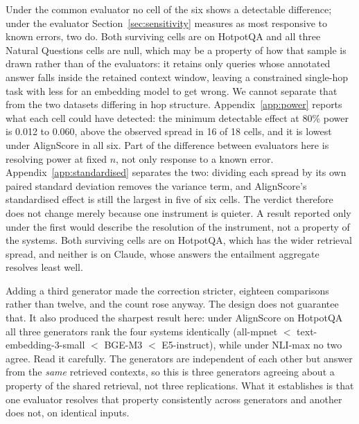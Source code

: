 \documentclass[11pt]{article}
\begin{document}
Under the common evaluator no cell of the six shows a detectable difference; under the evaluator Section~\ref{sec:sensitivity} measures as most responsive to known errors, two do. Both surviving cells are on HotpotQA and all three Natural Questions cells are null, which may be a property of how that sample is drawn rather than of the evaluators: it retains only queries whose annotated answer falls inside the retained context window, leaving a constrained single-hop task with less for an embedding model to get wrong. We cannot separate that from the two datasets differing in hop structure. Appendix~\ref{app:power} reports what each cell could have detected: the minimum detectable effect at 80\% power is 0.012 to 0.060, above the observed spread in 16 of 18 cells, and it is lowest under AlignScore in all six. Part of the difference between evaluators here is resolving power at fixed $n$, not only response to a known error. Appendix~\ref{app:standardised} separates the two: dividing each spread by its own paired standard deviation removes the variance term, and AlignScore's standardised effect is still the largest in five of six cells. The verdict therefore does not change merely because one instrument is quieter. A result reported only under the first would describe the resolution of the instrument, not a property of the systems. Both surviving cells are on HotpotQA, which has the wider retrieval spread, and neither is on Claude, whose answers the entailment aggregate resolves least well.

Adding a third generator made the correction stricter, eighteen comparisons rather than twelve, and the count rose anyway. The design does not guarantee that. It also produced the sharpest result here: under AlignScore on HotpotQA all three generators rank the four systems identically (all-mpnet $<$ text-embedding-3-small $<$ BGE-M3 $<$ E5-instruct), while under NLI-max no two agree. Read it carefully. The generators are independent of each other but answer from the \emph{same} retrieved contexts, so this is three generators agreeing about a property of the shared retrieval, not three replications. What it establishes is that one evaluator resolves that property consistently across generators and another does not, on identical inputs.
\end{document}
